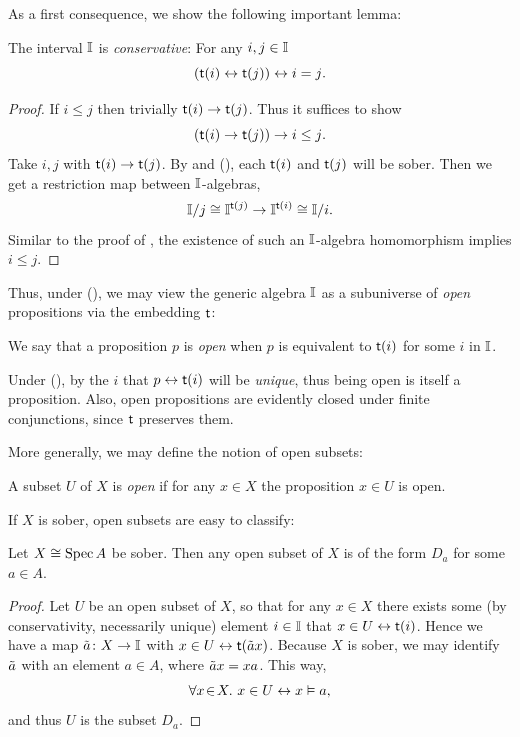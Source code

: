 As a first consequence, we show the following important lemma:

\begin{lemma}[\AxiomSQCI]\label{lem:intconserve}
  The interval $\mathbb{I}$ is \emph{conservative}: For any $i,j \in \mathbb{I}$
  \[ (\mathsf{t}(i) \leftrightarrow \mathsf{t}(j)) \leftrightarrow i = j\text{.} \]
\end{lemma}
\begin{proof}
  If $i \le j$ then trivially $\mathsf{t}(i) \to \mathsf{t}(j)$. Thus it suffices to show
  \[ (\mathsf{t}(i) \to \mathsf{t}(j)) \to i \le j\text{.} \]
  Take $i,j$ with $\mathsf{t}(i) \to \mathsf{t}(j)$. By  and (\AxiomSQCI), each $\mathsf{t}(i)$ and $\mathsf{t}(j)$ will be sober. Then we get a restriction map between $\mathbb{I}$-algebras,
  \[ \mathbb{I}/j \cong \mathbb{I}^{\mathsf{t}(j)} \to \mathbb{I}^{\mathsf{t}(i)} \cong \mathbb{I}/i\text{.} \]
  Similar to the proof of , the existence of such an $\mathbb{I}$-algebra homomorphism implies $i \le j$. 
\end{proof}

Thus, under (\AxiomSQCI), we may view the generic algebra $\mathbb{I}$ as a subuniverse of \emph{open} propositions via the embedding $\mathsf{t}$:

\begin{definition}
  We say that a proposition $p$ is \emph{open} when $p$ is equivalent to $\mathsf{t}(i)$ for some $i$ in $\mathbb{I}$.
\end{definition}

Under (\AxiomSQCI), by  the $i$ that $p \leftrightarrow \mathsf{t}(i)$ will be \emph{unique}, thus being open is itself a proposition. Also, open propositions are evidently closed under finite conjunctions, since $\mathsf{t}$ preserves them. 

More generally, we may define the notion of open subsets:

\begin{definition}
  A subset $U$ of $X$ is \emph{open} if for any $x\in X$ the proposition $x\in U$ is open.
\end{definition}

If $X$ is sober, open subsets are easy to classify:

\begin{lemma}[\AxiomSQCI]\label{lem:openofsobergivesalgebra}
  Let $X \cong \operatorname{Spec} A$ be sober. Then any open subset of $X$ is of the form $D_a$ for some $a\in A$.
\end{lemma}
\begin{proof}
  Let $U$ be an open subset of $X$, so that for any $x\in X$ there exists some (by conservativity, necessarily unique) element $i \in \mathbb{I}$ that $x \in U \leftrightarrow \mathsf{t}(i)$.
  Hence we have a map $\tilde{a} \colon X \to \mathbb{I}$ with $x \in U \leftrightarrow \mathsf{t}(\tilde{a}x)$. Because $X$ is sober, we may identify $\tilde{a}$ with an element $a\in A$, where $\tilde{a}x = xa$. This way,
  \[ \forall x\!\in\!X.\  x \in U \leftrightarrow x \vDash a\text{,} \]
  and thus $U$ is the subset $D_a$.
\end{proof}

